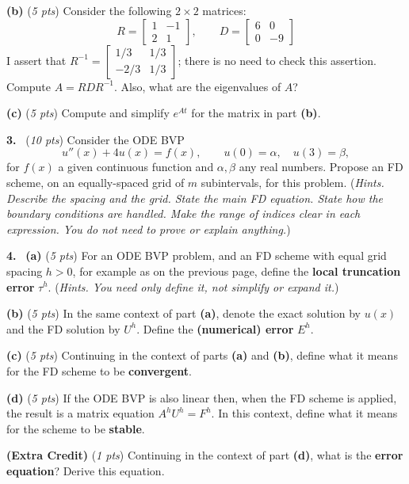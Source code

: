 \documentclass[11pt]{amsart}
\newcommand{\prob}[1]{\bigskip\noindent \textbf{#1.}~}
\newcommand{\pts}[1]{(\emph{#1 pts})}
\newcommand{\probpts}[2]{\prob{#1} \pts{#2} \quad}
\newcommand{\ppartpts}[2]{\textbf{(#1)} \pts{#2} \quad}
\newcommand{\epartpts}[2]{\medskip\noindent \textbf{(#1)} \pts{#2} \quad}
\begin{document}
\epartpts{b}{5}  Consider the following $2\times 2$ matrices:
    $$R = \begin{bmatrix} 1 & -1 \\ 2 & 1 \end{bmatrix}, \qquad D = \begin{bmatrix} 6 & 0 \\ 0 & -9 \end{bmatrix}$$
I assert that $R^{-1}=\begin{bmatrix} 1/3 & 1/3 \\ -2/3 & 1/3 \end{bmatrix}$; there is no need to check this assertion.  Compute $A=R D R^{-1}$.  Also, what are the eigenvalues of $A$?
\vfill

\epartpts{c}{5}  Compute and simplify $e^{At}$ for the matrix in part \textbf{(b)}.
\vfill


\newpage
\probpts{3}{10}   Consider the ODE BVP
\begin{equation}
    u''(x) + 4 u(x) = f(x), \qquad u(0)=\alpha, \quad u(3) = \beta,
\end{equation}
for $f(x)$ a given continuous function and $\alpha,\beta$ any real numbers.  Propose an FD scheme, on an equally-spaced grid of $m$ subintervals, for this problem.  (\emph{Hints.  Describe the spacing and the grid.  State the main FD equation.  State how the boundary conditions are handled.  Make the range of indices clear in each expression.  You do not need to prove or explain anything.})
\vfill


\newpage
\prob{4}  \ppartpts{a}{5}  For an ODE BVP problem, and an FD scheme with equal grid spacing $h>0$, for example as on the previous page, define the \textbf{local truncation error} $\tau^h$.  (\emph{Hints.  You need only \emph{define} it, not simplify or expand it.})
\vfill

\epartpts{b}{5}  In the same context of part \textbf{(a)}, denote the exact solution by $u(x)$ and the FD solution by $U^h$.  Define the \textbf{(numerical) error} $E^h$.
\vfill

\epartpts{c}{5}  Continuing in the context of parts \textbf{(a)} and \textbf{(b)}, define what it means for the FD scheme to be \textbf{convergent}.
\vfill

\epartpts{d}{5}  If the ODE BVP is also linear then, when the FD scheme is applied, the result is a matrix equation $A^h U^h = F^h$.  In this context, define what it means for the scheme to be \textbf{stable}.
\vfill

\epartpts{Extra Credit}{1}   Continuing in the context of part \textbf{(d)}, what is the \textbf{error equation}?  Derive this equation.
\vfill
\end{document}
